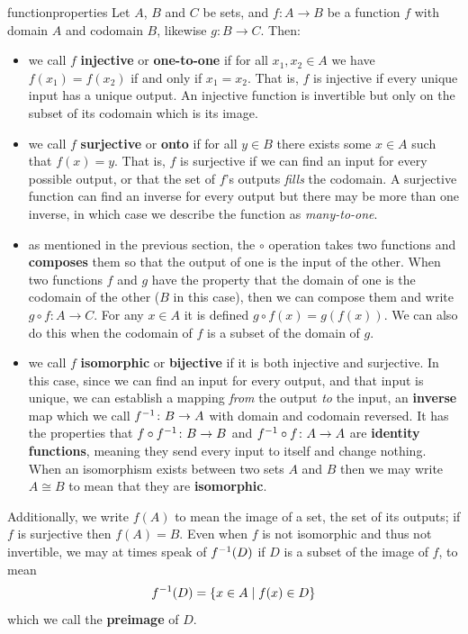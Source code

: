 \documentclass[11pt]{article}
\begin{document}
\begin{label definition}{functionproperties}
Let $A$, $B$ and $C$ be sets, and $f\colon A \to B$ be a function $f$ with domain $A$ and codomain $B$, likewise $g\colon B \to C$. Then: \begin{itemize}
\item we call $f$ \textbf{injective} or \textbf{one-to-one} if for all $x_1,x_2 \in A$ we have $f(x_1) = f(x_2)$ if and only if $x_1 = x_2$. That is, $f$ is injective if every unique input has a unique output. An injective function is invertible but only on the subset of its codomain which is its image.
\item we call $f$ \textbf{surjective} or \textbf{onto} if for all $y \in B$ there exists some $x \in A$ such that $f(x) = y$. That is, $f$ is surjective if we can find an input for every possible output, or that the set of $f$'s outputs \emph{fills} the codomain. A surjective function can find an inverse for every output but there may be more than one inverse, in which case we describe the function as \emph{many-to-one}.
\item as mentioned in the previous section, the $\circ$ operation takes two functions and \textbf{composes} them so that the output of one is the input of the other. When two functions $f$ and $g$ have the property that the domain of one is the codomain of the other ($B$ in this case), then we can compose them and write $g \circ f \colon A \to C$. For any $x \in A$ it is defined $g \circ f(x) = g(f(x))$. We can also do this when the codomain of $f$ is a subset of the domain of $g$.
\item we call $f$ \textbf{isomorphic} or \textbf{bijective} if it is both injective and surjective. In this case, since we can find an input for every output, and that input is unique, we can establish a mapping \emph{from} the output \emph{to} the input, an \textbf{inverse} map which we call $f^{-1} \colon B \to A$ with domain and codomain reversed. It has the properties that $f \circ f^{-1} \colon B \to B$ and $f^{-1} \circ f \colon A \to A$ are \textbf{identity functions}, meaning they send every input to itself and change nothing. When an isomorphism exists between two sets $A$ and $B$ then we may write $A \cong B$ to mean that they are \textbf{isomorphic}.
\end{itemize}
Additionally, we write $f(A)$ to mean the image of a set, the set of its outputs; if $f$ is surjective then $f(A) = B$. Even when $f$ is not isomorphic and thus not invertible, we may at times speak of $f^{-1} (D)$ if $D$ is a subset of the image of $f$, to mean \begin{gather*}
f^{-1}(D) = \left\{ x \in A \mid f(x) \in D \right\}
\end{gather*}
which we call the \textbf{preimage} of $D$. 
\end{label definition}
\end{document}

